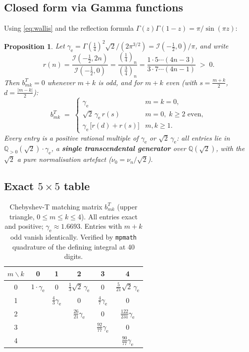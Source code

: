 \documentclass[11pt,a4paper]{article}
\newtheorem{proposition}[theorem]{Proposition}
\newcommand{\G}{\Gamma}
\begin{document}
\subsection{Closed form via Gamma functions}

Using \eqref{eq:wallis} and the reflection formula $\G(z)\G(1-z)=\pi/\sin(\pi z)$:

\begin{proposition}\label{prop:chebT-closed}
  Let $\gamma_\mathrm{e}=\G(\tfrac14)^2\sqrt{2}/(2\pi^{3/2})=\mathcal{I}(-\tfrac12,0)/\pi$,
  and write
  \[
    r(n)=\frac{\mathcal{I}(-\tfrac12,2n)}{\mathcal{I}(-\tfrac12,0)}
    =\frac{(\tfrac14)_n}{(\tfrac34)_n}
    = \frac{1\cdot5\cdots(4n-3)}{3\cdot7\cdots(4n-1)}\;>\;0.
  \]
  Then $b_{mk}^T=0$ whenever $m+k$ is odd, and for $m+k$ even
  (with $s=\tfrac{m+k}{2}$, $d=\tfrac{|m-k|}{2}$):
  \[
    b_{mk}^T \;=\;
    \begin{cases}
      \gamma_\mathrm{e} & m=k=0,\\
      \sqrt{2}\,\gamma_\mathrm{e}\,r(s) & m=0,\;k\ge2 \text{ even},\\
      \gamma_\mathrm{e}\,\bigl[r(d)+r(s)\bigr] & m,k\ge1.
    \end{cases}
  \]
  Every entry is a \emph{positive} rational multiple of $\gamma_\mathrm{e}$ or
  $\sqrt2\,\gamma_\mathrm{e}$: all entries lie in
  $\mathbb{Q}_{>0}(\sqrt{2})\cdot\gamma_\mathrm{e}$,
  a \textbf{single transcendental generator} over $\mathbb{Q}(\sqrt{2})$,
  with the $\sqrt2$ a pure normalisation artefact ($\nu_0=\nu_n/\sqrt2$).
\end{proposition}

\subsection{Exact $5\times5$ table}

\begin{table}[ht]
\centering
\caption{Chebyshev-T matching matrix $b_{mk}^T$ (upper triangle, $0\le m\le k\le 4$).
All entries exact and positive; $\gamma_\mathrm{e}\approx 1.6693$.
Entries with $m+k$ odd vanish identically.
Verified by \texttt{mpmath} quadrature of the defining integral at 40 digits.}
\label{tab:chebT}
\begin{tabular}{@{}c|ccccc@{}}
\toprule
$m\backslash k$ & 0 & 1 & 2 & 3 & 4 \\
\midrule
0 & $1\cdot\gamma_\mathrm{e}$
  & $0$
  & $\frac{1}{3}\sqrt{2}\,\gamma_\mathrm{e}$
  & $0$
  & $\frac{5}{21}\sqrt{2}\,\gamma_\mathrm{e}$ \\[4pt]
1 &
  & $\frac{4}{3}\gamma_\mathrm{e}$
  & $0$
  & $\frac{4}{7}\gamma_\mathrm{e}$
  & $0$ \\[4pt]
2 &
  &
  & $\frac{26}{21}\gamma_\mathrm{e}$
  & $0$
  & $\frac{122}{231}\gamma_\mathrm{e}$ \\[4pt]
3 &
  &
  &
  & $\frac{92}{77}\gamma_\mathrm{e}$
  & $0$ \\[4pt]
4 &
  &
  &
  &
  & $\frac{90}{77}\gamma_\mathrm{e}$ \\
\bottomrule
\end{tabular}
\end{table}
\end{document}
